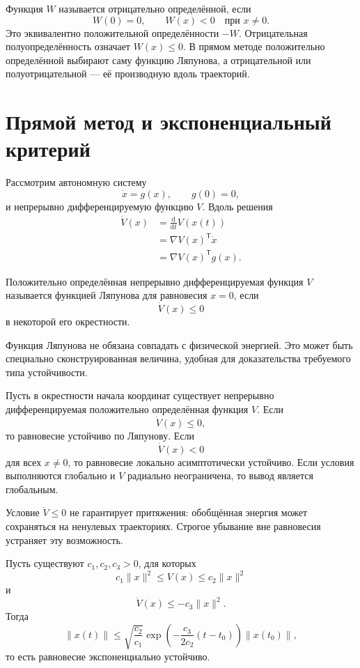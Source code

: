 Функция \(W\) называется отрицательно определённой, если
\[
    W(0)=0,
    \qquad
    W(x)<0
    \quad
    \text{при }x\ne0.
\]
Это эквивалентно положительной определённости \(-W\). Отрицательная
полуопределённость означает \(W(x)\le0\). В прямом методе положительно
определённой выбирают саму функцию Ляпунова, а отрицательной или
полуотрицательной --- её производную вдоль траекторий.

\section{Прямой метод и экспоненциальный критерий}

Рассмотрим автономную систему
\[
    \dot x=g(x),
    \qquad
    g(0)=0,
\]
и непрерывно дифференцируемую функцию \(V\). Вдоль решения
\[
\begin{aligned}
    \dot V(x)
    &=
    \frac{\mathrm d}{\mathrm dt}V(x(t))
    \\
    &=
    \nabla V(x)^{\mathsf T}\dot x
    \\
    &=
    \nabla V(x)^{\mathsf T}g(x).
\end{aligned}
\]

\begin{definition}
Положительно определённая непрерывно дифференцируемая функция \(V\)
называется функцией Ляпунова для равновесия \(x=0\), если
\[
    \dot V(x)\le0
\]
в некоторой его окрестности.
\end{definition}

Функция Ляпунова не обязана совпадать с физической энергией. Это
может быть специально сконструированная величина, удобная для
доказательства требуемого типа устойчивости.

\begin{theorem}
Пусть в окрестности начала координат существует непрерывно
дифференцируемая положительно определённая функция \(V\). Если
\[
    \dot V(x)\le0,
\]
то равновесие устойчиво по Ляпунову. Если
\[
    \dot V(x)<0
\]
для всех \(x\ne0\), то равновесие локально асимптотически устойчиво.
Если условия выполняются глобально и \(V\) радиально неограничена, то
вывод является глобальным.
\end{theorem}

Условие \(\dot V\le0\) не гарантирует притяжения: обобщённая энергия
может сохраняться на ненулевых траекториях. Строгое убывание вне
равновесия устраняет эту возможность.

\begin{theorem}
Пусть существуют \(c_1,c_2,c_3>0\), для которых
\[
    c_1\lVert x\rVert^2
    \le
    V(x)
    \le
    c_2\lVert x\rVert^2
\]
и
\[
    \dot V(x)
    \le
    -c_3\lVert x\rVert^2.
\]
Тогда
\[
    \lVert x(t)\rVert
    \le
    \sqrt{\frac{c_2}{c_1}}
    \exp\left(
        -\frac{c_3}{2c_2}(t-t_0)
    \right)
    \lVert x(t_0)\rVert,
\]
то есть равновесие экспоненциально устойчиво.
\end{theorem}

